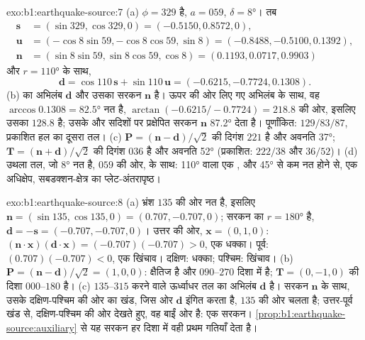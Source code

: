 \begin{solution}{exo:b1:earthquake-source:7}
(a)  $\phi = 329$ है,  $a = 059$,  $\delta =
\ang{8}$। तब
\[
  \begin{aligned}
    \mathbf s &= (\sin329, \cos329, 0) = (-0.5150, 0.8572, 0),\\
    \mathbf u &= (-\cos8\sin59, -\cos8\cos59, \sin8) = (-0.8488, -0.5100, 0.1392),\\
    \mathbf n &= (\sin8\sin59, \sin8\cos59, \cos8) = (0.1193, 0.0717, 0.9903)
  \end{aligned}
\]
और $r = \ang{110}$ के साथ,
\[
  \mathbf d = \cos110\,\mathbf s + \sin110\,\mathbf u = (-0.6215, -0.7724, 0.1308) .
\]
(b)  का अभिलंब $\mathbf d$ और उसका सरकन $\mathbf n$ है। ऊपर की ओर लिए गए अभिलंब के साथ, वह $\arccos 0.1308 = \ang{82.5}$ नत है,
$\arctan(-0.6215/-0.7724) = 218.8$ की ओर, इसलिए उसका  $128.8$ है; उसके  और  सदिशों पर प्रक्षेपित सरकन
$\mathbf n$  \ang{87.2} देता है। पूर्णांकित: $129/83/87$, प्रकाशित हल का दूसरा तल।
(c) $\mathbf P = (\mathbf n - \mathbf d)/\sqrt2$ की दिगंश $221$ है और अवनति \ang{37};
$\mathbf T = (\mathbf n + \mathbf d)/\sqrt2$ की दिगंश $036$ है और अवनति
\ang{52} (प्रकाशित: $222/38$ और $36/52$)। (d) उथला तल, जो \ang{8} नत है, $059$ की ओर,  के साथ:  \ang{110} वाला एक , और \ang{45} से कम नत होने से, एक अधिक्षेप, सबडक्शन-क्षेत्र का प्लेट-अंतरापृष्ठ।
\end{solution}

\begin{solution}{exo:b1:earthquake-source:8}
(a) भ्रंश $135$ की ओर नत है, इसलिए $\mathbf n = (\sin135, \cos135, 0) =
(0.707, -0.707, 0)$;  सरकन का $r = \ang{180}$ है, $\mathbf d = -\mathbf s
= (-0.707, -0.707, 0)$। उत्तर की ओर, $\mathbf x = (0, 1, 0)$:
$(\mathbf n\cdot\mathbf x)(\mathbf d\cdot\mathbf x) = (-0.707)(-0.707) > 0$, एक धक्का। पूर्व: $(0.707)(-0.707) < 0$, एक खिंचाव। दक्षिण: धक्का; पश्चिम: खिंचाव।
(b) $\mathbf P = (\mathbf n - \mathbf d)/\sqrt2 = (1, 0, 0)$:  क्षैतिज है और
$090$--$270$ दिशा में है; $\mathbf T = (0, -1, 0)$ की दिशा
$000$--$180$ है। (c) $135$--$315$  करने वाले ऊर्ध्वाधर तल का अभिलंब
$\mathbf d$ है। सरकन $\mathbf n$ के साथ, उसके दक्षिण-पश्चिम की ओर का खंड, जिस ओर
$\mathbf d$ इंगित करता है, $135$ की ओर चलता है; उत्तर-पूर्व खंड से, दक्षिण-पश्चिम की ओर देखते हुए, वह बाईं ओर है: एक  सरकन। \cref{prop:b1:earthquake-source:auxiliary} से यह सरकन हर दिशा में वही प्रथम गतियाँ देता है।
\end{solution}

